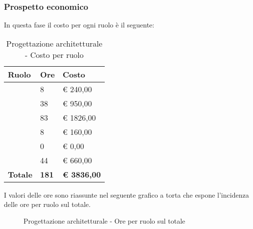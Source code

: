 		\subsubsection{Prospetto economico} %
		\label{ssub:prospetto_economico}
		In questa fase il costo per ogni ruolo è il seguente: \\
			\begin{table}[!ht]
				\begin{center}
					\begin{tabularx}{0.65\textwidth}{|l|l|X|}
						\hline
						\textbf{Ruolo} & \textbf{Ore} & \textbf{Costo} \\
						\hline
						\roleProjectManager & 8 & \euro{} 240,00 \\
						\hline
						\roleAnalyst & 38 & \euro{} 950,00 \\
						\hline
						\roleDesigner & 83 & \euro{} 1826,00 \\
						\hline
						\roleAdministrator & 8 & \euro{} 160,00 \\
						\hline
						\roleProgrammer & 0 & \euro{} 0,00 \\
						\hline
						\roleVerifier & 44 & \euro{} 660,00 \\
						\hline
						\textbf{Totale} & \textbf{181} & \textbf{\euro{} 3836,00} \\
						\hline
					\end{tabularx}
				\end{center}
			\caption{Progettazione architetturale - Costo per ruolo}
			\end{table}
			
			\noindent
			I valori delle ore sono riassunte nel seguente grafico a torta che espone l’incidenza delle ore per ruolo sul totale.
			\begin{center}
				\begin{figure}[htbp]
				\vspace{0.8cm}
				\caption{Progettazione architetturale - Ore per ruolo sul totale}
				\end{figure}
			\end{center}

